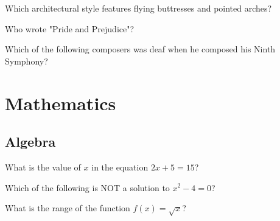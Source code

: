 \documentclass[12pt,a4paper]{book}
\begin{document}
\begin{enhancedmcq}[Architecture]{Which architectural style features flying buttresses and pointed arches?}
\end{enhancedmcq}

\begin{enhancedmcq}[Literature]{Who wrote "Pride and Prejudice"?}
\end{enhancedmcq}

\begin{enhancedmcq}[Music]{Which of the following composers was deaf when he composed his Ninth Symphony?}
\end{enhancedmcq}

\chapter{Mathematics}
\section{Algebra}

\begin{enhancedmcq}{What is the value of $x$ in the equation $2x + 5 = 15$?}
\end{enhancedmcq}

\begin{enhancedmcq}{Which of the following is NOT a solution to $x^2 - 4 = 0$?}
\end{enhancedmcq}

\begin{enhancedmcq}[Functions]{What is the range of the function $f(x) = \sqrt{x}$?}
\end{enhancedmcq}
\end{document}
